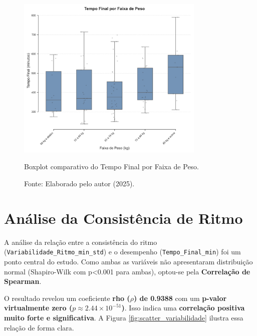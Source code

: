 \begin{figure}[H]
    \centering
    \includegraphics[width=0.8\textwidth]{Imagens/boxplot_tempo_por_peso.png}
    \caption{Boxplot comparativo do Tempo Final por Faixa de Peso.}
    \label{fig:boxplot_peso}
    \caption*{Fonte: Elaborado pelo autor (2025).}
\end{figure}

\section{Análise da Consistência de Ritmo}

A análise da relação entre a consistência do ritmo (\texttt{Variabilidade\_Ritmo\_min\_std}) e o desempenho (\texttt{Tempo\_Final\_min}) foi um ponto central do estudo. Como ambas as variáveis não apresentaram distribuição normal (Shapiro-Wilk com p<0.001 para ambas), optou-se pela \textbf{Correlação de Spearman}.

O resultado revelou um coeficiente \textbf{rho ($\rho$) de 0.9388} com um \textbf{p-valor virtualmente zero ($p \approx 2.44 \times 10^{-51}$)}. Isso indica uma \textbf{correlação positiva muito forte e significativa}. A Figura \ref{fig:scatter_variabilidade} ilustra essa relação de forma clara.

